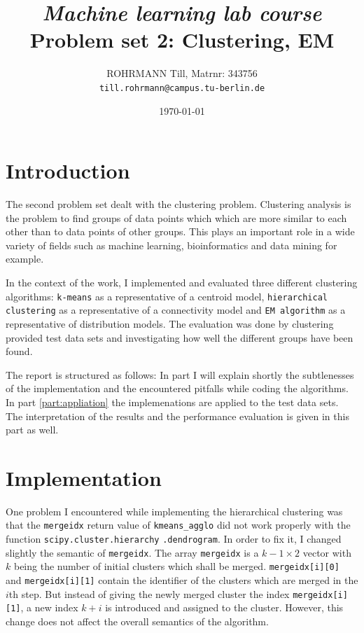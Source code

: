 \documentclass[a4paper, 12pt, titlepage]{article}
\title
{{\em Machine learning lab course}\\
Problem set 2: Clustering, EM}
\author{ROHRMANN Till, Matrnr: 343756\\
\texttt{till.rohrmann@campus.tu-berlin.de}}
\date{\today}
\begin{document}
\maketitle

\part{Introduction}
\label{part:introduction}

The second problem set dealt with the clustering problem.
Clustering analysis is the problem to find groups of data points which which are more similar to each other than to data points of other groups.
This plays an important role in a wide variety of fields such as machine learning, bioinformatics and data mining for example.

In the context of the work, I implemented and evaluated three different clustering algorithms:
\texttt{k-means} as a representative of a centroid model, \texttt{hierarchical clustering} as a representative of a connectivity model and \texttt{EM algorithm} as a representative of distribution models.
The evaluation was done by clustering provided test data sets and investigating how well the different groups have been found.

The report is structured as follows:
In part \ref{part:implementation} I will explain shortly the subtlenesses of the implementation and the encountered pitfalls while coding the algorithms.
In part \ref{part:appliation} the implemenations are applied to the test data sets.
The interpretation of the results and the performance evaluation is given in this part as well.

\part{Implementation}
\label{part:implementation}

One problem I encountered while implementing the hierarchical clustering was that the \texttt{mergeidx} return value of \texttt{kmeans\_agglo} did not work properly with the function \texttt{scipy.cluster.hierarchy} \texttt{.dendrogram}.
In order to fix it, I changed slightly the semantic of \texttt{mergeidx}.
The array \texttt{mergeidx} is a $k-1 \times 2$ vector with $k$ being the number of initial clusters which shall be merged.
\texttt{mergeidx[i][0]} and \texttt{mergeidx[i][1]} contain the identifier of the clusters which are merged in the $i$th step.
But instead of giving the newly merged cluster the index \texttt{mergeidx[i][1]}, a new index $k+i$ is introduced and assigned to the cluster.
However, this change does not affect the overall semantics of the algorithm.
\end{document}
